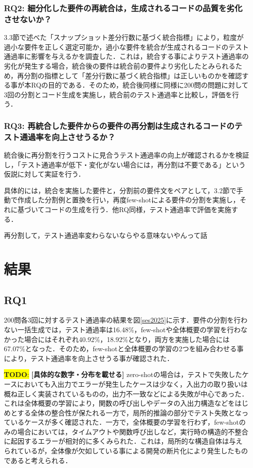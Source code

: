 \documentclass[submit,techrep,noauthor]{ipsj}
\newcommand{\todo}[1]{\colorbox{yellow}{{\bf TODO}:}{\color{red} {\textbf{[#1]}}}}
\begin{document}
\subsubsection{RQ2: 細分化した要件の再統合は，生成されるコードの品質を劣化させないか？}
3.3節で述べた「スナップショット差分行数に基づく統合指標」により，粒度が過小な要件を正しく選定可能か，過小な要件を統合が生成されるコードのテスト通過率に影響を与えるかを調査した．これは，統合する事によりテスト通過率の劣化が発生する場合，統合後の要件は統合前の要件より劣化したとみられるため，再分割の指標として「差分行数に基づく統合指標」は正しいものかを確認する事が本RQの目的である．そのため，統合後同様に同様に200問の問題に対して3回の分割とコード生成を実施し，統合前のテスト通過率と比較し，評価を行う．


\subsubsection{RQ3: 再統合した要件からの要件の再分割は生成されるコードのテスト通過率を向上させうるか？}
統合後に再分割を行うコストに見合うテスト通過率の向上が確認されるかを検証し，「テスト通過率が低下・変化がない場合には，再分割は不要である」という仮説に対して実証を行う．

具体的には，統合を実施した要件と，分割前の要件文をペアとして，3.2節で手動で作成した分割例と置換を行い，再度few-shotによる要件の分割を実施し，それに基づいてコードの生成を行う．他RQ同様，テスト通過率で評価を実施する．

再分割して，テスト通過率変わらないならやる意味ないやんって話

\section{結果}
\label{sec:result}

\subsection{RQ1}
200問各3回に対するテスト通過率の結果を図\ref{ses2025}に示す．要件の分割を行わない一括生成では，テスト通過率は16.48\%，few-shotや全体概要の学習を行わなかった場合にはそれぞれ40.92\%，18.92\%となり，両方を実施した場合には67.07\%となった．そのため，few-shotと全体概要の学習の2つを組み合わせる事により，テスト通過率を向上させうる事が確認された．

\todo{具体的な数字・分布を載せる}
zero-shotの場合は，テストで失敗したケースにおいても入出力でエラーが発生したケースは少なく，入出力の取り扱いは概ね正しく実装されているものの，出力不一致などによる失敗が中心であった．これは全体概要の学習により，関数の呼び出しやデータの入出力構造などをはじめとする全体の整合性が保たれる一方で，局所的推論の部分でテスト失敗となっているケースが多く確認された．一方で，全体概要の学習を行わず，few-shotのみの場合においては，タイムアウトや関数呼び出しなど，実行時の構造的不整合に起因するエラーが相対的に多くみられた．これは，局所的な構造自体は与えられているが，全体像が欠如している事による開発の断片化により発生したものであると考えられる．
\end{document}
